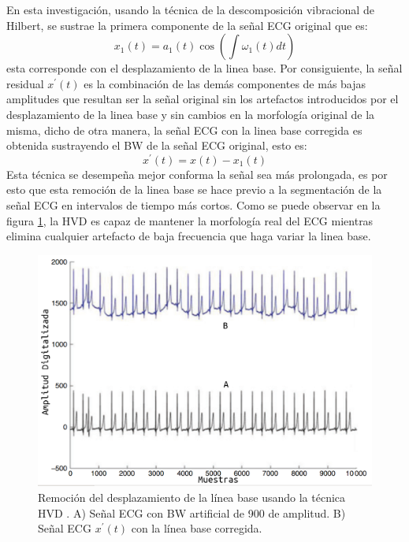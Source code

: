 \documentclass[12pt,letterpaper,oneside,openright]{book}
\begin{document}
En esta investigación, usando la técnica de la descomposición vibracional de Hilbert, se sustrae la primera componente de la señal ECG original que es:
\begin{equation}
	x_1(t) = a_1(t)\cos \left(\int \omega_1(t)dt \right)
	\label{eq:baseline_wander}
\end{equation}
esta corresponde con el desplazamiento de la linea base. Por consiguiente, la señal residual $x^{\prime}(t)$ es la combinación de las demás componentes de más bajas amplitudes que resultan ser la señal original sin los artefactos introducidos por el desplazamiento de la linea base y sin cambios en la morfología original de la misma, dicho de otra manera, la señal ECG con la linea base corregida es obtenida sustrayendo el BW de la señal ECG original, esto es:
\begin{equation}
	x^{\prime}(t)=x(t)-x_1(t)
	\label{eq:senal_sin_bw}
\end{equation}
Esta técnica se desempeña mejor conforma la señal sea más prolongada, es por esto que esta remoción de la linea base se hace previo a la segmentación de la señal ECG en intervalos de tiempo más cortos. Como se puede observar en la figura \ref{fig:remocion_bw}, la HVD es capaz de mantener la morfología real del ECG mientras elimina cualquier artefacto de baja frecuencia que haga variar la linea base.
\begin{figure}[h]
	\centering
	\includegraphics[width=0.85\linewidth]{Sem_1/figuras/Baseline Wander Sharma.png}
	\caption{Remoción del desplazamiento de la línea base usando la técnica HVD \cite{Sharma15}.
		A) Señal ECG con BW artificial de 900 de amplitud. 
		B) Señal ECG $x^{\prime}(t)$ con la línea base corregida.}
	\label{fig:remocion_bw}
\end{figure}
 	
\end{document}
